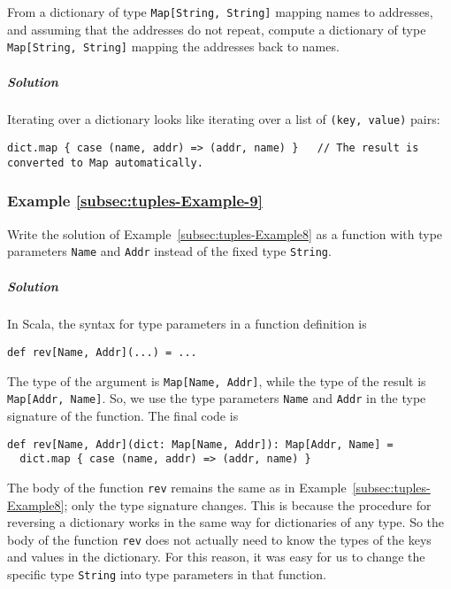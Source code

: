 From a dictionary of type \lstinline!Map[String, String]! mapping
names to addresses, and assuming that the addresses do not repeat,
compute a dictionary of type \lstinline!Map[String, String]! mapping
the addresses back to names. 

\subparagraph{Solution}

Iterating over a dictionary looks like iterating over a list of \lstinline!(key, value)!
pairs:

\begin{lstlisting}
dict.map { case (name, addr) => (addr, name) }   // The result is converted to Map automatically.
\end{lstlisting}


\subsubsection{Example \label{subsec:tuples-Example-9}\ref{subsec:tuples-Example-9}}

Write the solution of Example~\ref{subsec:tuples-Example8} as a
function with type parameters \lstinline!Name! and \lstinline!Addr!
instead of the fixed type \lstinline!String!.

\subparagraph{Solution}

In Scala, the syntax for type parameters in a function definition
is
\begin{lstlisting}
def rev[Name, Addr](...) = ...
\end{lstlisting}
The type of the argument is \lstinline!Map[Name, Addr]!, while the
type of the result is \lstinline!Map[Addr, Name]!. So, we use the
type parameters \lstinline!Name! and \lstinline!Addr! in the type
signature of the function. The final code is
\begin{lstlisting}
def rev[Name, Addr](dict: Map[Name, Addr]): Map[Addr, Name] =
  dict.map { case (name, addr) => (addr, name) }
\end{lstlisting}
The body of the function \lstinline!rev! remains the same as in Example~\ref{subsec:tuples-Example8};
only the type signature changes. This is because the procedure for
reversing a dictionary works in the same way for dictionaries of any
type. So the body of the function \lstinline!rev! does not actually
need to know the types of the keys and values in the dictionary. For
this reason, it was easy for us to change the specific type \lstinline!String!
into type parameters in that function.

